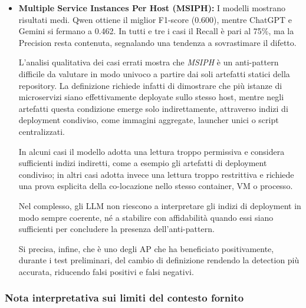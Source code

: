 \begin{itemize}
    Nel complesso, i risultati suggeriscono quindi che i modelli riescano a riconoscere bene i segnali osservabili associati a \textit{Manual Configuration}, ma tendano talvolta ad adottare una soglia troppo ampia nel classificare tali segnali come prova sufficiente dell’anti-pattern.

    \item \textbf{Multiple Service Instances Per Host (MSIPH):} I modelli mostrano risultati medi. Qwen ottiene il miglior F1-score (0.600), mentre ChatGPT e Gemini si fermano a 0.462. In tutti e tre i casi il Recall è pari al 75\%, ma la Precision resta contenuta, segnalando una tendenza a sovrastimare il difetto.

    L'analisi qualitativa dei casi errati mostra che \textit{MSIPH} è un anti-pattern difficile da valutare in modo univoco a partire dai soli artefatti statici della repository. La definizione richiede infatti di dimostrare che più istanze di microservizi siano effettivamente deployate sullo stesso host, mentre negli artefatti questa condizione emerge solo indirettamente, attraverso indizi di deployment condiviso, come immagini aggregate, launcher unici o script centralizzati.
    
    In alcuni casi il modello adotta una lettura troppo permissiva e considera sufficienti indizi indiretti, come a esempio gli artefatti di deployment condiviso; in altri casi adotta invece una lettura troppo restrittiva e richiede una prova esplicita della co-locazione nello stesso container, VM o processo.
    
    Nel complesso, gli LLM non riescono a interpretare gli indizi di deployment in modo sempre coerente, né a stabilire con affidabilità quando essi siano sufficienti per concludere la presenza dell’anti-pattern.

    Si precisa, infine, che è uno degli AP che ha beneficiato positivamente, durante i test preliminari, del cambio di definizione rendendo la detection più accurata, riducendo falsi positivi e falsi negativi. 
   


\end{itemize}
    

\subsubsection*{Nota interpretativa sui limiti del contesto fornito}

